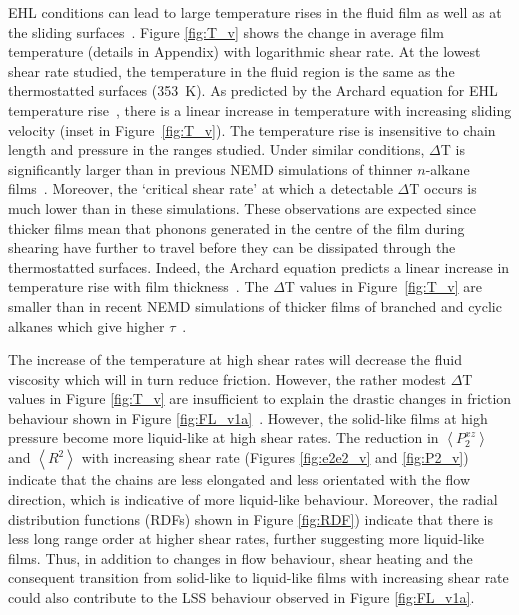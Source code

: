 \documentclass[5p]{elsarticle}
\begin{document}
EHL conditions can lead to large temperature rises in the fluid film as well as at the sliding surfaces~\cite{Spikes2014}. Figure \ref{fig:T_v} shows the change in average film temperature (details in Appendix) with logarithmic shear rate. At the lowest shear rate studied, the temperature in the fluid region is the same as the thermostatted surfaces (\SI{353}{\kelvin}). As predicted by the Archard equation for EHL temperature rise~\cite{Archard1959}, there is a linear increase in temperature with increasing sliding velocity (inset in Figure~\ref{fig:T_v}). The temperature rise is insensitive to chain length and pressure in the ranges studied. Under similar conditions, $\Delta$T is significantly larger than in previous NEMD simulations of thinner $n$-alkane films~\cite{Berro2011,Ta2017}. Moreover, the `critical shear rate' at which a detectable $\Delta$T occurs is much lower than in these simulations. These observations are expected since thicker films mean that phonons generated in the centre of the film during shearing have further to travel before they can be dissipated through the thermostatted surfaces. Indeed, the Archard equation predicts a linear increase in temperature rise with film thickness~\cite{Archard1959}. The $\Delta$T values in Figure~\ref{fig:T_v} are smaller than in recent NEMD simulations of thicker films of branched and cyclic alkanes which give higher $\tau$~\cite{Ewen2019}.

The increase of the temperature at high shear rates will decrease the fluid viscosity which will in turn reduce friction. However, the rather modest $\Delta$T values in Figure \ref{fig:T_v} are insufficient to explain the drastic changes in friction behaviour shown in Figure \ref{fig:FL_v1a}~\cite{Berro2011,Ewen2019}. However, the solid-like films at high pressure become more liquid-like at high shear rates. The reduction in $\left<P_{2}^{xz} \right> $ and $\left< R^2 \right>$ with increasing shear rate (Figures \ref{fig:e2e2_v} and \ref{fig:P2_v}) indicate that the chains are less elongated and less orientated with the flow direction, which is indicative of more liquid-like behaviour. Moreover, the radial distribution functions (RDFs) shown in Figure \ref{fig:RDF}) indicate that there is less long range order at higher shear rates, further suggesting more liquid-like films. Thus, in addition to changes in flow behaviour, shear heating and the consequent transition from solid-like to liquid-like films with increasing shear rate could also contribute to the LSS behaviour observed in Figure \ref{fig:FL_v1a}.
\end{document}
